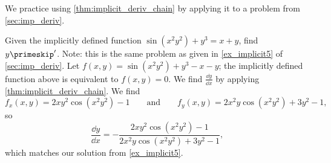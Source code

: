 We practice using \autoref{thm:implicit_deriv_chain} by applying it to a problem from \autoref{sec:imp_deriv}.

\begin{example}\label{ex_mchain5}
Given the implicitly defined function $\sin(x^2y^2)+y^3=x+y$, find $y\primeskip'$. Note: this is the same problem as given in \autoref{ex_implicit5} of \autoref{sec:imp_deriv}.
\solution
Let $f(x,y) = \sin(x^2y^2)+y^3-x-y$; the implicitly defined function above is equivalent to $f(x,y)=0$. We find $\frac{\dd y}{\dd x}$ by applying \autoref{thm:implicit_deriv_chain}. We find 
\[f_x(x,y) = 2xy^2\cos(x^2y^2)-1\qquad \text{and}\qquad f_y(x,y) = 2x^2y\cos(x^2y^2)+3y^2-1,\]
so 
\[\frac{\dd y}{\dd x} = -\frac{2xy^2\cos(x^2y^2)-1}{2x^2y\cos(x^2y^2)+3y^2-1},\]
which matches our solution from \autoref{ex_implicit5}.
\end{example}


